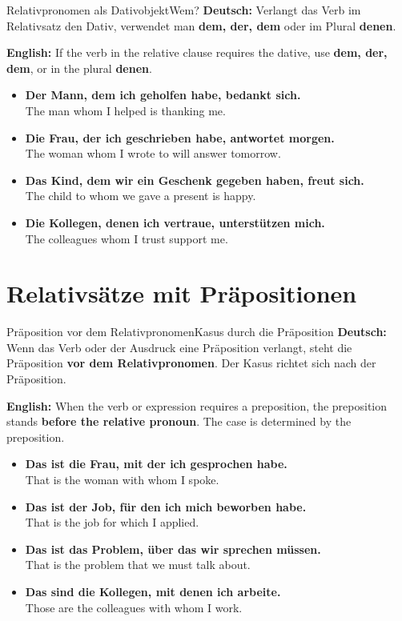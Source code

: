 \documentclass[a4paper,11pt]{article}
\newcommand{\GermanText}[1]{\textbf{Deutsch: }#1\par}
\newcommand{\EnglishText}[1]{{\small\color{SoftGray}\textbf{English: }#1\par}}
\newcommand{\ExampleItem}[2]{\item \textbf{#1}\\{\small\color{SoftGray}#2}}
\begin{document}
        \begin{grammarentry}{Relativpronomen als Dativobjekt}{Wem?}
            \GermanText{Verlangt das Verb im Relativsatz den Dativ, verwendet man \textbf{dem, der, dem} oder im Plural \textbf{denen}.}
            \EnglishText{If the verb in the relative clause requires the dative, use \textbf{dem, der, dem}, or in the plural \textbf{denen}.}
        \end{grammarentry}

        \begin{exbox}
            \begin{itemize}
                \ExampleItem{Der Mann, dem ich geholfen habe, bedankt sich.}{The man whom I helped is thanking me.}
                \ExampleItem{Die Frau, der ich geschrieben habe, antwortet morgen.}{The woman whom I wrote to will answer tomorrow.}
                \ExampleItem{Das Kind, dem wir ein Geschenk gegeben haben, freut sich.}{The child to whom we gave a present is happy.}
                \ExampleItem{Die Kollegen, denen ich vertraue, unterstützen mich.}{The colleagues whom I trust support me.}
            \end{itemize}
        \end{exbox}

    \section{Relativsätze mit Präpositionen}

        \begin{grammarentry}{Präposition vor dem Relativpronomen}{Kasus durch die Präposition}
            \GermanText{Wenn das Verb oder der Ausdruck eine Präposition verlangt, steht die Präposition \textbf{vor dem Relativpronomen}. Der Kasus richtet sich nach der Präposition.}
            \EnglishText{When the verb or expression requires a preposition, the preposition stands \textbf{before the relative pronoun}. The case is determined by the preposition.}
        \end{grammarentry}

        \begin{exbox}
            \begin{itemize}
                \ExampleItem{Das ist die Frau, mit der ich gesprochen habe.}{That is the woman with whom I spoke.}
                \ExampleItem{Das ist der Job, für den ich mich beworben habe.}{That is the job for which I applied.}
                \ExampleItem{Das ist das Problem, über das wir sprechen müssen.}{That is the problem that we must talk about.}
                \ExampleItem{Das sind die Kollegen, mit denen ich arbeite.}{Those are the colleagues with whom I work.}
            \end{itemize}
        \end{exbox}
\end{document}
